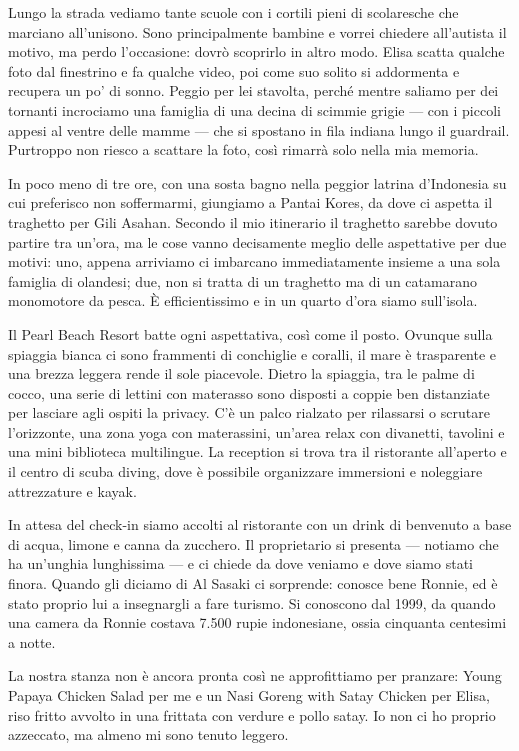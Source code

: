 Lungo la strada vediamo tante scuole con i cortili pieni di scolaresche che marciano all'unisono. Sono principalmente bambine e vorrei chiedere all'autista il motivo, ma perdo l'occasione: dovrò scoprirlo in altro modo. Elisa scatta qualche foto dal finestrino e fa qualche video, poi come suo solito si addormenta e recupera un po' di sonno. Peggio per lei stavolta, perché mentre saliamo per dei tornanti incrociamo una famiglia di una decina di scimmie grigie — con i piccoli appesi al ventre delle mamme — che si spostano in fila indiana lungo il guardrail. Purtroppo non riesco a scattare la foto, così rimarrà solo nella mia memoria.

In poco meno di tre ore, con una sosta bagno nella peggior latrina d'Indonesia su cui preferisco non soffermarmi, giungiamo a Pantai Kores, da dove ci aspetta il traghetto per Gili Asahan. Secondo il mio itinerario il traghetto sarebbe dovuto partire tra un'ora, ma le cose vanno decisamente meglio delle aspettative per due motivi: uno, appena arriviamo ci imbarcano immediatamente insieme a una sola famiglia di olandesi; due, non si tratta di un traghetto ma di un catamarano monomotore da pesca. È efficientissimo e in un quarto d'ora siamo sull'isola.

Il Pearl Beach Resort batte ogni aspettativa, così come il posto. Ovunque sulla spiaggia bianca ci sono frammenti di conchiglie e coralli, il mare è trasparente e una brezza leggera rende il sole piacevole. Dietro la spiaggia, tra le palme di cocco, una serie di lettini con materasso sono disposti a coppie ben distanziate per lasciare agli ospiti la privacy. C'è un palco rialzato per rilassarsi o scrutare l'orizzonte, una zona yoga con materassini, un'area relax con divanetti, tavolini e una mini biblioteca multilingue. La reception si trova tra il ristorante all'aperto e il centro di scuba diving, dove è possibile organizzare immersioni e noleggiare attrezzature e kayak.

In attesa del check-in siamo accolti al ristorante con un drink di benvenuto a base di acqua, limone e canna da zucchero. Il proprietario si presenta — notiamo che ha un'unghia lunghissima — e ci chiede da dove veniamo e dove siamo stati finora. Quando gli diciamo di Al Sasaki ci sorprende: conosce bene Ronnie, ed è stato proprio lui a insegnargli a fare turismo. Si conoscono dal 1999, da quando una camera da Ronnie costava 7.500 rupie indonesiane, ossia cinquanta centesimi a notte.

La nostra stanza non è ancora pronta così ne approfittiamo per pranzare: Young Papaya Chicken Salad per me e un Nasi Goreng with Satay Chicken per Elisa, riso fritto avvolto in una frittata con verdure e pollo satay. Io non ci ho proprio azzeccato, ma almeno mi sono tenuto leggero.

